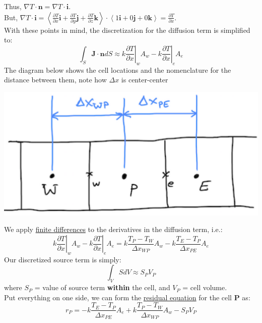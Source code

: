 \documentclass[11pt]{article}
\begin{document}
Thus, \(\nabla T \cdot \textbf{n} = \nabla T \cdot \textbf{i}\).\\
But, \(\nabla T \cdot \textbf{i} = \left < \frac{\partial T}{\partial x} \textbf{i} + \frac{\partial T}{\partial y} \textbf{j} + \frac{\partial T}{\partial z} \textbf{k}
  \right > \cdot \left <1 \textbf{i} + 0 \textbf{j} + 0 \textbf{k}    \right> = \frac{\partial T}{\partial x}\). \\
With these points in mind, the discretization for the diffusion term is simplified to:
\begin{equation}
\int_S \textbf{J} \cdot \textbf{n} dS \approx k \left .\frac{\partial T}{\partial x}\right|_w A_w
- k \left .\frac{\partial T}{\partial x}\right|_e A_e 
\end{equation}
The diagram below shows the cell locations and the nomenclature for the distance between them, note how \(\Delta x\) is center-center
\begin{center}
\includegraphics[scale=0.2]{../pic/heat1D_cell.png}
\end{center}
We apply \uline{finite differences} to the derivatives in the diffusion term, i.e.:
\begin{equation}
k \left .\frac{\partial T}{\partial x}\right|_w A_w - k \left .\frac{\partial T}{\partial x}\right|_e A_e
= k\frac{T_P-T_W}{\Delta x_{WP}}A_w - k\frac{T_E-T_P}{\Delta x_{PE}}A_e
\end{equation}
Our discretized source term is simply:
\begin{equation}
\int_V SdV \approx S_PV_P
\end{equation}
where \(S_P\) = value of source term \textbf{within} the cell, and \(V_P\) = cell volume.\\
Put everything on one side, we can form the \uline{residual equation} for the cell \(\textbf{P}\) as:
\begin{equation}
r_P = - k\frac{T_E-T_P}{\Delta x_{PE}}A_e + k\frac{T_P-T_W}{\Delta x_{WP}}A_w - S_PV_P
\end{equation}
\end{document}
